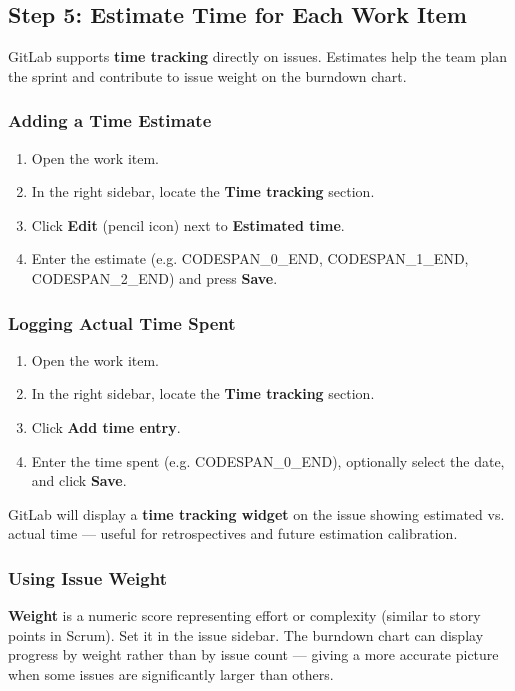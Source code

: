 \documentclass[11pt,a4paper]{book}
\begin{document}
\medskip

\subsection{Step 5: Estimate Time for Each Work Item}

GitLab supports \textbf{time tracking} directly on issues. Estimates help the team plan the sprint and contribute to issue weight on the burndown chart.

\subsubsection{Adding a Time Estimate}

\begin{enumerate}
  \item Open the work item.
  \item In the right sidebar, locate the \textbf{Time tracking} section.
  \item Click \textbf{Edit} (pencil icon) next to \textbf{Estimated time}.
  \item Enter the estimate (e.g. CODESPAN\_0\_END, CODESPAN\_1\_END, CODESPAN\_2\_END) and press \textbf{Save}.
\end{enumerate}

\subsubsection{Logging Actual Time Spent}

\begin{enumerate}
  \item Open the work item.
  \item In the right sidebar, locate the \textbf{Time tracking} section.
  \item Click \textbf{Add time entry}.
  \item Enter the time spent (e.g. CODESPAN\_0\_END), optionally select the date, and click \textbf{Save}.
\end{enumerate}

GitLab will display a \textbf{time tracking widget} on the issue showing estimated vs. actual time --- useful for retrospectives and future estimation calibration.

\subsubsection{Using Issue Weight}

\textbf{Weight} is a numeric score representing effort or complexity (similar to story points in Scrum). Set it in the issue sidebar. The burndown chart can display progress by weight rather than by issue count --- giving a more accurate picture when some issues are significantly larger than others.
\end{document}
